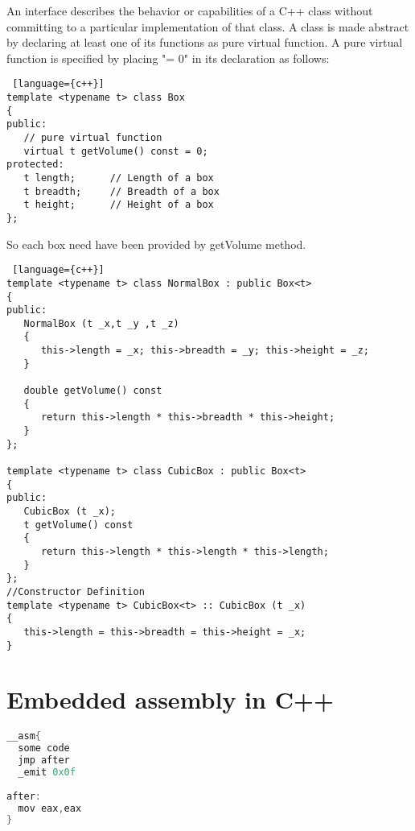 \begin{note}

An interface describes the behavior or capabilities of a C++ class without committing to a particular implementation of that class. A class is made abstract by declaring at least one of its functions as pure virtual function. A pure virtual function is specified by placing "= 0" in its declaration as follows:
\begin{lstlisting} [language={c++}]
template <typename t> class Box
{
public:
   // pure virtual function
   virtual t getVolume() const = 0;
protected:
   t length;      // Length of a box
   t breadth;     // Breadth of a box
   t height;      // Height of a box
};
\end{lstlisting}
So each box need have been provided by getVolume method.
\begin{lstlisting} [language={c++}]
template <typename t> class NormalBox : public Box<t>
{
public:
   NormalBox (t _x,t _y ,t _z)
   {
      this->length = _x; this->breadth = _y; this->height = _z;
   }

   double getVolume() const
   {
      return this->length * this->breadth * this->height;
   }
};

template <typename t> class CubicBox : public Box<t>
{
public:
   CubicBox (t _x);
   t getVolume() const
   {
      return this->length * this->length * this->length;
   }
};
//Constructor Definition
template <typename t> CubicBox<t> :: CubicBox (t _x) 
{
   this->length = this->breadth = this->height = _x;
}
\end{lstlisting}
\end{note}

\section{Embedded assembly in C++}
\begin{note}

\begin{lstlisting}[language={c++}]
__asm{
  some code
  jmp after
  _emit 0x0f
		
after:
  mov eax,eax
}
\end{lstlisting}
\end{note}

